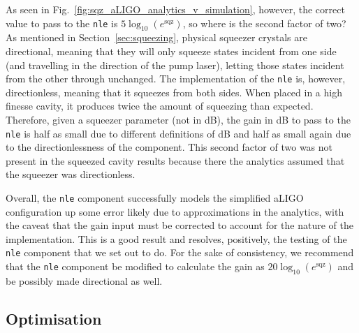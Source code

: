 \documentclass[aps,pra,superscriptaddress,reprint,nofootinbib]{revtex4-1}
\newcommand{\code}[1]{\texttt{#1}}
\begin{document}
As seen in Fig.~\ref{fig:sqz_aLIGO_analytics_v_simulation}, however, the correct value to pass to the \code{nle} is $5 \log_{10}(e^\mathrm{sqz})$, so where is the second factor of two? As mentioned in Section~\ref{sec:squeezing}, physical squeezer crystals are directional, meaning that they will only squeeze states incident from one side (and travelling in the direction of the pump laser), letting those states incident from the other through unchanged. The implementation of the \code{nle} is, however, directionless, meaning that it squeezes from both sides. When placed in a high finesse cavity, it produces twice the amount of squeezing than expected. Therefore, given a squeezer parameter (not in dB), the gain in dB to pass to the \code{nle} is half as small due to different definitions of dB and half as small again due to the directionlessness of the component. This second factor of two was not present in the squeezed cavity results because there the analytics assumed that the squeezer was directionless.


Overall, the \code{nle} component successfully models the simplified aLIGO configuration up some error likely due to approximations in the analytics, with the caveat that the gain input must be corrected to account for the nature of the implementation. This is a good result and resolves, positively, the testing of the \code{nle} component that we set out to do. For the sake of consistency, we recommend that the \code{nle} component be modified to calculate the gain as $20 \log_{10}(e^\mathrm{sqz})$ and be possibly made directional as well.


\subsection{Optimisation}
\label{sec:optimisation}
\end{document}
